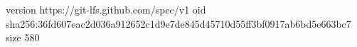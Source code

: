 version https://git-lfs.github.com/spec/v1
oid sha256:36fd607eac2d036a912652c1d9e7de845d45710d55ff3bf0917ab6bd5e663bc7
size 580
